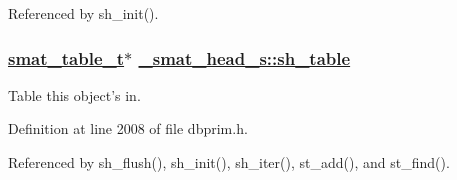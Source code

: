 Referenced by sh\_\-init().\hypertarget{struct__smat__head__s_o2}{
\subsubsection[sh\_\-table]{\setlength{\rightskip}{0pt plus 5cm}\hyperlink{struct__smat__table__s}{smat\_\-table\_\-t}$\ast$ \hyperlink{struct__smat__head__s_o2}{\_\-smat\_\-head\_\-s::sh\_\-table}}}
\label{struct__smat__head__s_o2}


Table this object's in. 

Definition at line 2008 of file dbprim.h.

Referenced by sh\_\-flush(), sh\_\-init(), sh\_\-iter(), st\_\-add(), and st\_\-find().
